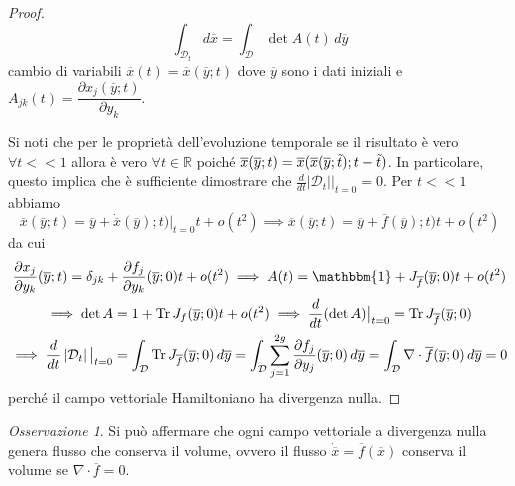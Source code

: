 \documentclass{book}
\theoremstyle{plain}
\theoremstyle{plain}
\theoremstyle{plain}
\theoremstyle{plain}
\theoremstyle{plain}
\theoremstyle{definition}
\theoremstyle{remark}
\newtheorem*{oss}{Osservazione}
\theoremstyle{definition}
\begin{document}
\begin{proof}
    \begin{displaymath}
        \int_{\mathcal{D}_t}d\overline{x}=\int_{\mathcal{D}}\det{A(t)}\,d\overline{y}
    \end{displaymath}
    cambio di variabili $\overline{x}(t)=\overline{x}(\overline{y}; t)$ dove $\overline{y}$ sono i dati iniziali e $A_{jk}(t)=\dfrac{\partial x_j(\overline{y}; t)}{\partial y_k}$.

    \noindent Si noti che per le proprietà dell'evoluzione temporale se il risultato è vero $\forall t <<1$ allora è vero $\forall t\in\mathbb{R}$ poiché $\overline{x}(\overline{y};t)=\overline{x}(\overline{x}(\overline{y};\Tilde{t});t-\Tilde{t})$. In particolare, questo implica che è sufficiente dimostrare che $\frac{d}{dt}\left|\mathcal{D}_t\right|\big|_{t=0}=0$. Per $t<<1$ abbiamo
    \begin{displaymath}
        \overline{x}(\overline{y};t)=\overline{y}+\Dot{\overline{x}}(\overline{y});t)|_{t=0}t+o(t^2)\implies\overline{x}(\overline{y};t)=\overline{y}+\overline{f}(\overline{y});t)t+o(t^2)
    \end{displaymath}
    da cui
    \begin{gather*}
        \frac{\partial x_j}{\partial y_k}(\overline{y};t)=\delta_{jk}+\frac{\partial f_j}{\partial y_k}(\overline{y};0)t+o(t^2)\implies A(t)=\mathbbm{1}+J_{\overline{f}}(\overline{y};0)t+o(t^2) \\
        \implies\det{A}=1+\operatorname{Tr}{J_f}(\overline{y};0)t+o(t^2)\implies\frac{d}{dt}(\det{A})\big|_{t=0}=\operatorname{Tr}{J_{\overline{f}}(\overline{y};0}) \\
        \implies\frac{d}{dt}\left|\mathcal{D}_t\right|\big|_{t=0}=\int_{\mathcal{D}}\operatorname{Tr}J_{\overline{f}}(\overline{y};0)\,d\overline{y}=\int_{\mathcal{D}}\sum_{j=1}^{2g}\frac{\partial f_j}{\partial y_j}(\overline{y}; 0)\,d\overline{y}=\int_{\mathcal{D}}\nabla\cdot\overline{f}(\overline{y};0)\,d\overline{y}=0
    \end{gather*}
    perché il campo vettoriale Hamiltoniano ha divergenza nulla.
\end{proof}

\begin{oss}
    Si può affermare che ogni campo vettoriale a divergenza nulla genera flusso che conserva il volume, ovvero il flusso $\dot{\overline{x}}=\overline{f}(\overline{x})$ conserva il volume se $\nabla\cdot\overline{f}=0$.
\end{oss}
\end{document}
